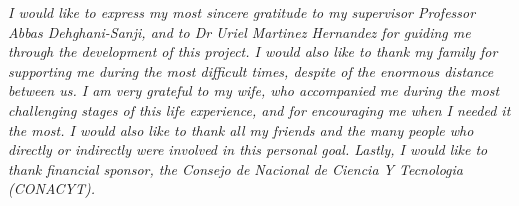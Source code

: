 

\begin{acknowledgements}      %

\setlength{\parindent}{17.62482pt}
\setlength{\parskip}{0.0pt plus 1.0pt}

\textit{I would like to express my most sincere gratitude to my supervisor Professor Abbas Dehghani-Sanji, and to Dr Uriel Martinez Hernandez for guiding me through the development of this project. I would also like to thank my family for supporting me during the most difficult times, despite of the enormous distance between us. I am very grateful to my wife, who accompanied me during the most challenging stages of this life experience, and for encouraging me when I needed it the most. I would also like to thank all my friends and the many people who directly or indirectly were involved in this personal goal. Lastly, I would like to thank financial sponsor, the Consejo de Nacional de Ciencia Y Tecnologia (CONACYT).}

\end{acknowledgements}


